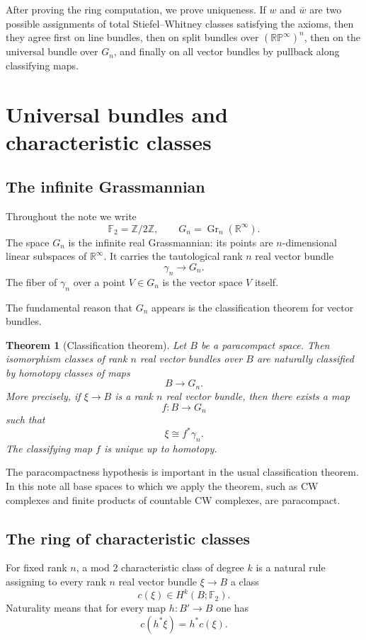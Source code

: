 \documentclass[11pt]{article}
\newcommand{\F}{\mathbb F}
\newcommand{\R}{\mathbb R}
\newcommand{\Z}{\mathbb Z}
\newcommand{\RP}{\mathbb{RP}}
\newcommand{\Gr}{\operatorname{Gr}}
\theoremstyle{plain}
\newtheorem{theorem}{Theorem}[section]
\theoremstyle{definition}
\numberwithin{equation}{section}
\begin{document}
After proving the ring computation, we prove uniqueness.  If $w$ and $\overline w$ are two possible assignments of total Stiefel--Whitney classes satisfying the axioms, then they agree first on line bundles, then on split bundles over $(\RP^\infty)^n$, then on the universal bundle over $G_n$, and finally on all vector bundles by pullback along classifying maps.

\section{Universal bundles and characteristic classes}

\subsection{The infinite Grassmannian}

Throughout the note we write
\[
  \F_2=\Z/2\Z,
  \qquad
  G_n=\Gr_n(\R^\infty).
\]
The space $G_n$ is the infinite real Grassmannian: its points are $n$-dimensional linear subspaces of $\R^\infty$.  It carries the tautological rank $n$ real vector bundle
\[
  \gamma_n\longrightarrow G_n.
\]
The fiber of $\gamma_n$ over a point $V\in G_n$ is the vector space $V$ itself.

The fundamental reason that $G_n$ appears is the classification theorem for vector bundles.

\begin{theorem}[Classification theorem]
Let $B$ be a paracompact space.  Then isomorphism classes of rank $n$ real vector bundles over $B$ are naturally classified by homotopy classes of maps
\[
  B\longrightarrow G_n.
\]
More precisely, if $\xi\to B$ is a rank $n$ real vector bundle, then there exists a map
\[
  f:B\to G_n
\]
such that
\[
  \xi\cong f^*\gamma_n.
\]
The classifying map $f$ is unique up to homotopy.
\end{theorem}

The paracompactness hypothesis is important in the usual classification theorem.  In this note all base spaces to which we apply the theorem, such as CW complexes and finite products of countable CW complexes, are paracompact.

\subsection{The ring of characteristic classes}

For fixed rank $n$, a mod $2$ characteristic class of degree $k$ is a natural rule assigning to every rank $n$ real vector bundle $\xi\to B$ a class
\[
  c(\xi)\in H^k(B;\F_2).
\]
Naturality means that for every map $h:B'\to B$ one has
\[
  c(h^*\xi)=h^*c(\xi).
\]
\end{document}

